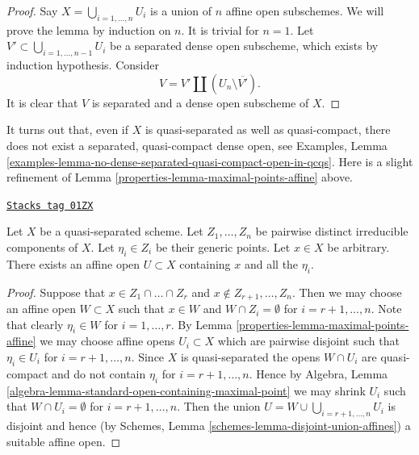 \begin{proof}
Say $X = \bigcup_{i = 1, \ldots, n} U_i$ is a union of $n$ affine open
subschemes. We will prove the lemma by induction on $n$. It is trivial for
$n = 1$. Let $V' \subset \bigcup_{i = 1, \ldots, n - 1} U_i$ be a separated
dense open subscheme, which exists by induction hypothesis. Consider
$$
V = V' \amalg (U_n \setminus \overline{V'}).
$$
It is clear that $V$ is separated and a dense open subscheme of $X$.
\end{proof}

It turns out that, even if $X$ is quasi-separated as well as quasi-compact,
there does not exist a separated, quasi-compact dense open, see
Examples, Lemma
\ref{examples-lemma-no-dense-separated-quasi-compact-open-in-qcqs}.
Here is a slight refinement of Lemma \ref{properties-lemma-maximal-points-affine} above.

\begin{lemma}
\label{properties-lemma-point-and-maximal-points-affine}
\href{https://stacks.math.columbia.edu/tag/01ZX}{\texttt{Stacks tag 01ZX}}

Let $X$ be a quasi-separated scheme. Let $Z_1, \ldots, Z_n$ be pairwise
distinct irreducible components of $X$. Let $\eta_i \in Z_i$ be their
generic points. Let $x \in X$ be arbitrary.
There exists an affine open $U \subset X$ containing
$x$ and all the $\eta_i$.
\end{lemma}

\begin{proof}

Suppose that $x \in Z_1 \cap \ldots \cap Z_r$ and
$x \not \in Z_{r + 1}, \ldots, Z_n$. Then we may choose
an affine open $W \subset X$ such that
$x \in W$ and $W \cap Z_i = \emptyset$ for
$i = r + 1, \ldots, n$. Note that clearly $\eta_i \in W$
for $i = 1, \ldots, r$. By Lemma \ref{properties-lemma-maximal-points-affine}
we may choose affine opens $U_i \subset X$ which are pairwise
disjoint such that $\eta_i \in U_i$ for $i = r + 1, \ldots, n$.
Since $X$ is quasi-separated the opens $W \cap U_i$
are quasi-compact and do not contain $\eta_i$ for
$i = r + 1, \ldots, n$. Hence by
Algebra, Lemma \ref{algebra-lemma-standard-open-containing-maximal-point}
we may shrink $U_i$ such that $W \cap U_i = \emptyset$
for $i = r + 1, \ldots, n$. Then the union
$U = W \cup \bigcup_{i = r + 1, \ldots, n} U_i$ is disjoint and hence
(by Schemes, Lemma \ref{schemes-lemma-disjoint-union-affines})
a suitable affine open.
\end{proof}

